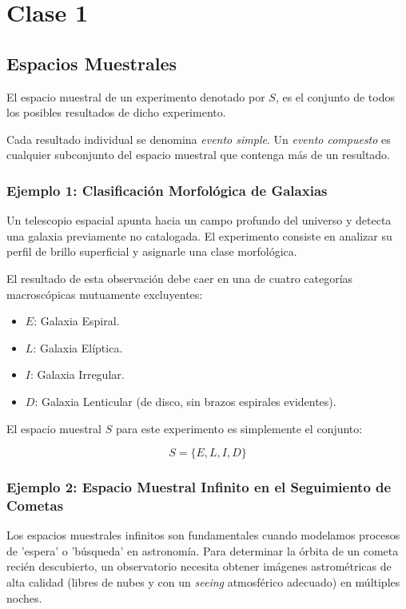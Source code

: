 \chapter{Clase 1}

\section{Espacios Muestrales}

El espacio muestral de un experimento denotado por $S$, es el conjunto de todos los posibles resultados de dicho experimento. 

Cada resultado individual se denomina \textit{evento simple}. Un \textit{evento compuesto} es cualquier subconjunto del espacio muestral que contenga más de un resultado.

\subsection{Ejemplo 1: Clasificación Morfológica de Galaxias}
Un telescopio espacial apunta hacia un campo profundo del universo y detecta una galaxia previamente no catalogada. El experimento consiste en analizar su perfil de brillo superficial y asignarle una clase morfológica.

El resultado de esta observación debe caer en una de cuatro categorías macroscópicas mutuamente excluyentes:
\begin{itemize}
    \item $E$: Galaxia Espiral.
    \item $L$: Galaxia Elíptica.
    \item $I$: Galaxia Irregular.
    \item $D$: Galaxia Lenticular (de disco, sin brazos espirales evidentes).
\end{itemize}
El espacio muestral $S$ para este experimento es simplemente el conjunto:

$$ S = \{E, L, I, D\} $$

\subsection{Ejemplo 2: Espacio Muestral Infinito en el Seguimiento de Cometas}

Los espacios muestrales infinitos son fundamentales cuando modelamos procesos de 'espera' o 'búsqueda' en astronomía. Para determinar la órbita de un cometa recién descubierto, un observatorio necesita obtener imágenes astrométricas de alta calidad (libres de nubes y con un \textit{seeing} atmosférico adecuado) en múltiples noches.

